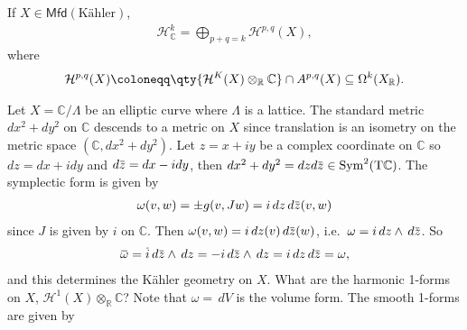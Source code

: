 \begin{theorem}[?]

If \(X \in {\mathsf{Mfd}}(\text{Kähler})\),
\begin{align*}
{\mathcal{H}}^k_{\mathbb{C}}= \bigoplus_{p+q = k} {\mathcal{H}}^{p, q}(X)
,\end{align*}
where
\begin{align*}
{\mathcal{H}}^{p, q}(X) \coloneqq
\qty{ {\mathcal{H}}^K(X) \otimes_{\mathbb{R}}{\mathbb{C}}} \cap A^{p, q}(X) \subseteq \Omega^k(X_{\mathbb{R}})
.\end{align*}

\end{theorem}

\begin{example}[?]

Let \(X = {\mathbb{C}}/ \Lambda\) be an elliptic curve where \(\Lambda\)
is a lattice. The standard metric \(dx^2 + dy^2\) on \({\mathbb{C}}\)
descends to a metric on \(X\) since translation is an isometry on the
metric space \(({\mathbb{C}}, dx^2 + dy^2)\). Let \(z=x+iy\) be a
complex coordinate on \({\mathbb{C}}\) so \(dz = dx + idy\) and
\(d\mkern 1.5mu\overline{\mkern-1.5muz\mkern-1.5mu}\mkern 1.5mu = dx - idy\),
then
\(dx^2 + dy^2 = dz d\mkern 1.5mu\overline{\mkern-1.5muz\mkern-1.5mu}\mkern 1.5mu \in \operatorname{Sym}^2(\mathrm{T}{\mathbb{C}})\).
The symplectic form is given by
\begin{align*} 
\omega(v, w) = \pm g(v, Jw) = i \,dz\,d\mkern 1.5mu\overline{\mkern-1.5muz\mkern-1.5mu}\mkern 1.5mu (v, w) 
\end{align*}
since \(J\) is given by \(i\) on \({\mathbb{C}}\). Then
\(\omega(v, w) = i \,dz(v) \,d\mkern 1.5mu\overline{\mkern-1.5muz\mkern-1.5mu}\mkern 1.5mu (w)\),
i.e.~\(\omega = i\,dz\wedge \,d\mkern 1.5mu\overline{\mkern-1.5muz\mkern-1.5mu}\mkern 1.5mu\).
So
\begin{align*} 
\mkern 1.5mu\overline{\mkern-1.5mu \omega\mkern-1.5mu}\mkern 1.5mu = \mkern 1.5mu\overline{\mkern-1.5mui\mkern-1.5mu}\mkern 1.5mu \,d\mkern 1.5mu\overline{\mkern-1.5muz\mkern-1.5mu}\mkern 1.5mu \wedge \,dz= -i \,d\mkern 1.5mu\overline{\mkern-1.5muz\mkern-1.5mu}\mkern 1.5mu \wedge \,dz= i\,dz\,d\mkern 1.5mu\overline{\mkern-1.5muz\mkern-1.5mu}\mkern 1.5mu = \omega
, \end{align*}
and this determines the Kähler geometry on \(X\). What are the harmonic
1-forms on \(X\),
\({\mathcal{H}}^1(X) \otimes_{\mathbb{R}}{\mathbb{C}}\)? Note that
\(\omega= \,dV\) is the volume form. The smooth 1-forms are given by
\begin{align*} 

\end{align*}
\end{example}

